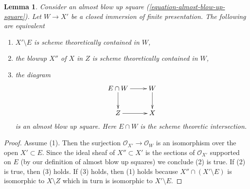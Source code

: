 \documentclass[10pt,a4paper]{amsart}
\theoremstyle{plain}
\newtheorem{lemma}[subsection]{Lemma}
\theoremstyle{definition}
\theoremstyle{remark}
\numberwithin{equation}{subsection}
\begin{document}
\begin{lemma}
\label{lemma-shrink-almost-blow-up}
Consider an almost blow up square (\ref{equation-almost-blow-up-square}).
Let $W \to X'$ be a closed immersion of finite presentation.
The following are equivalent
\begin{enumerate}
\item $X' \setminus E$ is scheme theoretically contained in $W$,
\item the blowup $X''$ of $X$ in $Z$ is scheme theoretically contained in $W$,
\item the diagram
$$
\xymatrix{
E \cap W \ar[d] \ar[r] & W \ar[d] \\
Z \ar[r] & X
}
$$
is an almost blow up square. Here $E \cap W$ is the
scheme theoretic intersection.
\end{enumerate}
\end{lemma}

\begin{proof}
Assume (1). Then the surjection $\mathcal{O}_{X'} \to \mathcal{O}_W$
is an isomorphism over the open $X' \subset E$. Since the ideal sheaf
of $X'' \subset X'$ is the sections of $\mathcal{O}_{X'}$ supported on $E$
(by our definition of almost blow up squares)
we conclude (2) is true. If (2) is true, then (3) holds.
If (3) holds, then (1) holds because $X'' \cap (X' \setminus E)$
is isomorphic to $X \setminus Z$ which in turn is isomorphic
to $X' \setminus E$.
\end{proof}
\end{document}
